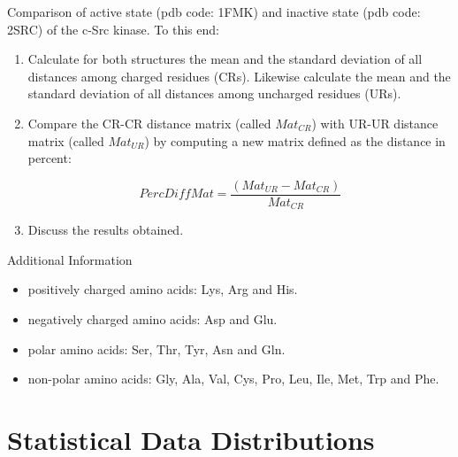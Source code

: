 \documentclass[
  letterpaper,
  DIV=11,
  numbers=noendperiod]{scrreprt}
\begin{document}
\begin{tcolorbox}[enhanced jigsaw, arc=.35mm, breakable, toptitle=1mm, opacityback=0, bottomrule=.15mm, toprule=.15mm, rightrule=.15mm, titlerule=0mm, opacitybacktitle=0.6, coltitle=black, left=2mm, title=\textcolor{quarto-callout-caution-color}{\faFire}\hspace{0.5em}{Test}, bottomtitle=1mm, leftrule=.75mm, colback=white, colbacktitle=quarto-callout-caution-color!10!white, colframe=quarto-callout-caution-color-frame]

Comparison of active state (pdb code: 1FMK) and inactive state (pdb
code: 2SRC) of the c-Src kinase. To this end:

\begin{enumerate}
\def\labelenumi{\arabic{enumi}.}
\item
  Calculate for both structures the mean and the standard deviation of
  all distances among charged residues (CRs). Likewise calculate the
  mean and the standard deviation of all distances among uncharged
  residues (URs).
\item
  Compare the CR-CR distance matrix (called \(Mat_{CR}\)) with UR-UR
  distance matrix (called \(Mat_{UR}\)) by computing a new matrix
  defined as the distance in percent:

  \[
  PercDiffMat = \frac{(Mat_{UR} - Mat_{CR})}{Mat_{CR}}
  \]
\item
  Discuss the results obtained.
\end{enumerate}

Additional Information

\begin{itemize}
\item
  positively charged amino acids: Lys, Arg and His.
\item
  negatively charged amino acids: Asp and Glu.
\item
  polar amino acids: Ser, Thr, Tyr, Asn and Gln.
\item
  non-polar amino acids: Gly, Ala, Val, Cys, Pro, Leu, Ile, Met, Trp and
  Phe.
\end{itemize}

\end{tcolorbox}


\hypertarget{statistical-data-distributions}{%
\chapter{Statistical Data
Distributions}\label{statistical-data-distributions}}
\end{document}
